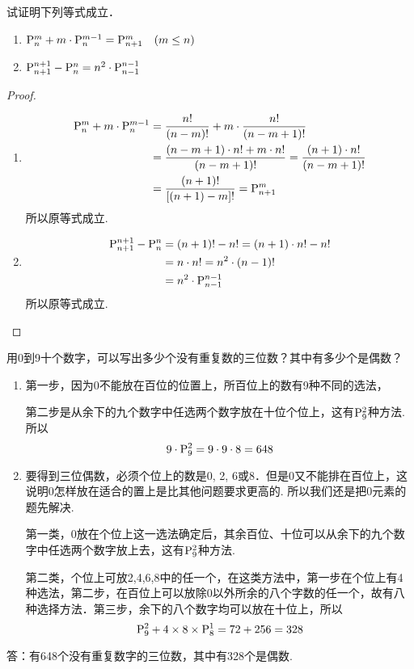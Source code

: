 \begin{example}
    试证明下列等式成立．
\begin{multicols}{2}
\begin{enumerate}[(1)]
    \item ${\rm P}^{m}_{n}+m\cdot {\rm P}^{m-1}_{n}={\rm P}^{m}_{n+1}\quad (m\le n)$
\item ${\rm P}^{n+1}_{n+1}-{\rm P}^{n}_{n}=n^2\cdot {\rm P}^{n-1}_{n-1}$
\end{enumerate}
\end{multicols}
\end{example}

\begin{proof}
\begin{enumerate}[(1)]
    \item \[\begin{split}
        {\rm P}^{m}_{n}+m\cdot {\rm P}^{m-1}_{n}&=\dfrac{n!}{(n-m)!}+m\cdot\dfrac{n!}{(n-m+1)!}\\
        &=\dfrac{(n-m+1)\cdot n!+m\cdot n!}{(n-m+1)!}=\dfrac{(n+1)\cdot n!}{(n-m+1)!}\\
        &=\dfrac{(n+1)!}{[(n+1)-m]!}={\rm P}^{m}_{n+1}
    \end{split}\]
所以原等式成立.

\item \[\begin{split}
    {\rm P}^{n+1}_{n+1}-{\rm P}^{n}_{n}&=(n+1)!-n!=(n+1)\cdot n!-n!\\
    &=n\cdot n!=n^2\cdot (n-1)!\\
    &=n^2\cdot {\rm P}^{n-1}_{n-1}
\end{split}\]
所以原等式成立.
\end{enumerate}
\end{proof}

\begin{example}
    用0到9十个数字，可以写出多少个没有重复数的三位数？其中有多少个是偶数？
\end{example}

\begin{solution}
\begin{enumerate}[(1)]
    \item 第一步，因为0不能放在百位的位置上，所百位上的数有9种不同的选法，
    
第二步是从余下的九个数字中任选两个数字放在十位个位上，这有${\rm P}^{2}_{9}$种方法.所以
\[9\cdot {\rm P}^{2}_{9}=9\cdot 9\cdot 8=648\]
\item 要得到三位偶数，必须个位上的数是0, 2, 6或8．但是0又不能排在百位上，这说明0怎样放在适合的置上是比其他问题要求更高的. 所以我们还是把0元素的题先解决.

第一类，0放在个位上这一选法确定后，其余百位、十位可以从余下的九个数字中任选两个数字放上去，这有${\rm P}^{2}_{9}$种方法.

第二类，个位上可放2,4,6,8中的任一个，在这类方法中，第一步在个位上有4种选法，第二步，在百位上可以放除0以外所余的八个字数的任一个，故有八种选择方法．第三步，余下的八个数字均可以放在十位上，所以
\[{\rm P}^{2}_{9}+4\times8\times{\rm P}^{1}_{8}=72+256=328\]
\end{enumerate}
答：有648个没有重复数字的三位数，其中有328个是偶数.

\end{solution}

